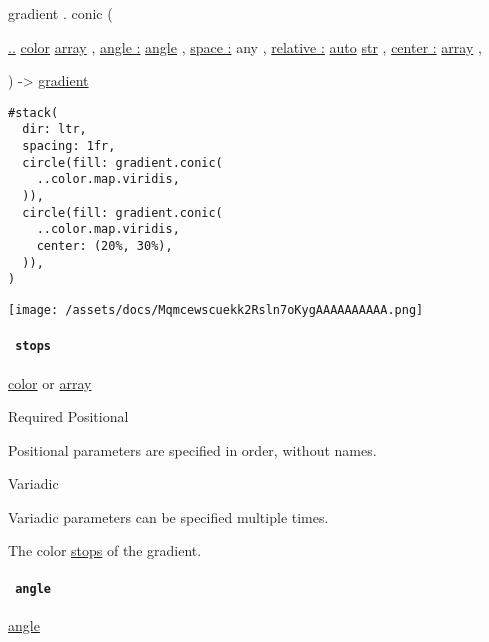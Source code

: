 gradient { . } { conic } (

{ \hyperref[definitions-conic-parameters-stops]{..}
\href{/docs/reference/visualize/color/}{color}
\href{/docs/reference/foundations/array/}{array} , } {
\hyperref[definitions-conic-parameters-angle]{angle :}
\href{/docs/reference/layout/angle/}{angle} , } {
\hyperref[definitions-conic-parameters-space]{space :} { any } , } {
\hyperref[definitions-conic-parameters-relative]{relative :}
\href{/docs/reference/foundations/auto/}{auto}
\href{/docs/reference/foundations/str/}{str} , } {
\hyperref[definitions-conic-parameters-center]{center :}
\href{/docs/reference/foundations/array/}{array} , }

) -\textgreater{} \href{/docs/reference/visualize/gradient/}{gradient}

\begin{verbatim}
#stack(
  dir: ltr,
  spacing: 1fr,
  circle(fill: gradient.conic(
    ..color.map.viridis,
  )),
  circle(fill: gradient.conic(
    ..color.map.viridis,
    center: (20%, 30%),
  )),
)
\end{verbatim}

\texttt{[image: /assets/docs/Mqmcewscuekk2Rsln7oKygAAAAAAAAAA.png]}

\paragraph{\texorpdfstring{\texttt{\ stops\ }}{ stops }}\label{definitions-conic-stops}

\href{/docs/reference/visualize/color/}{color} {or}
\href{/docs/reference/foundations/array/}{array}

{Required} {{ Positional }}

\label{definitions-conic-stops-positional-tooltip}
Positional parameters are specified in order, without names.

{{ Variadic }}

\label{definitions-conic-stops-variadic-tooltip}
Variadic parameters can be specified multiple times.

The color \hyperref[stops]{stops} of the gradient.

\paragraph{\texorpdfstring{\texttt{\ angle\ }}{ angle }}\label{definitions-conic-angle}

\href{/docs/reference/layout/angle/}{angle}

